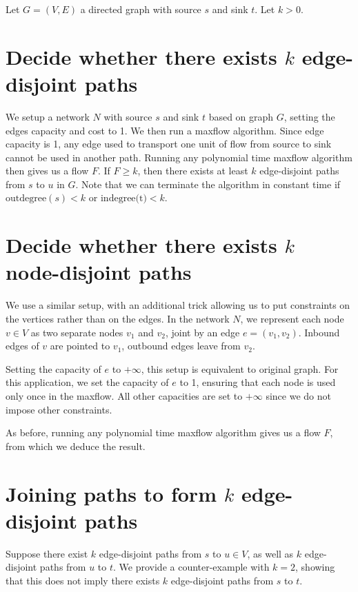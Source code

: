 Let $G = (V, E)$ a directed graph with source $s$ and sink $t$. Let $k > 0$.


\section{Decide whether there exists $k$ \textbf{edge}-disjoint paths}
We setup a network $N$ with source $s$ and sink $t$ based on graph $G$, setting the edges capacity and cost to 1. We then run a maxflow algorithm. Since edge capacity is 1, any edge used to transport one unit of flow from source to sink cannot be used in another path. Running any polynomial time maxflow algorithm then gives us a flow $F$. If $F \geq k$, then there exists at least $k$ edge-disjoint paths from $s$ to $u$ in $G$. Note that we can terminate the algorithm in constant time if $\text{outdegree}(s) < k$ or $\text{indegree(t)} < k$.

\section{Decide whether there exists $k$ \textbf{node}-disjoint paths}
We use a similar setup, with an additional trick allowing us to put constraints on the vertices rather than on the edges. In the network $N$, we represent each node $v \in V$ as two separate nodes $v_1$ and $v_2$, joint by an edge $e = (v_1, v_2)$. Inbound edges of $v$ are pointed to $v_1$, outbound edges leave from $v_2$.

Setting the capacity of $e$ to $+\infty$, this setup is equivalent to original graph. For this application, we set the capacity of $e$ to 1, ensuring that each node is used only once in the maxflow. All other capacities are set to $+\infty$ since we do not impose other constraints.

As before, running any polynomial time maxflow algorithm gives us a flow $F$, from which we deduce the result.

\section{Joining paths to form $k$ \textbf{edge}-disjoint paths}
Suppose there exist $k$ edge-disjoint paths from $s$ to $u \in V$, as well as $k$ edge-disjoint paths from $u$ to $t$. We provide a counter-example with $k = 2$, showing that this does not imply there exists $k$ edge-disjoint paths from $s$ to $t$.

